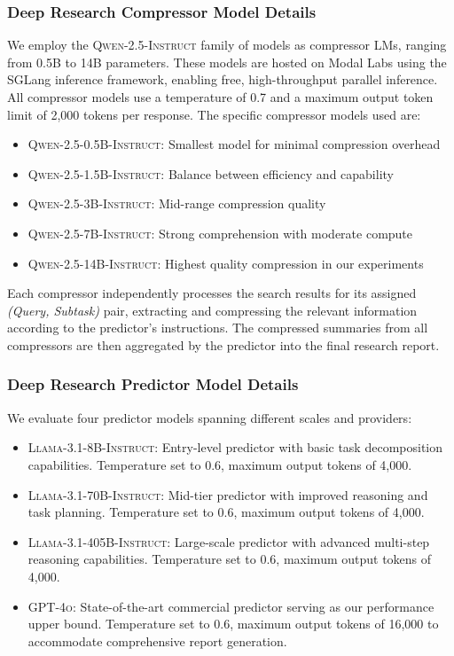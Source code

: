 \documentclass{article} %
\begin{document}
\subsubsection{Deep Research Compressor Model Details}
\label{sec:appendix-deepresearch-compressors}
We employ the \textsc{Qwen-2.5-Instruct} family of models as compressor LMs, ranging from 0.5B to 14B parameters. These models are hosted on Modal Labs using the SGLang inference framework, enabling free, high-throughput parallel inference. All compressor models use a temperature of 0.7 and a maximum output token limit of 2,000 tokens per response. The specific compressor models used are: 
\begin{itemize}[leftmargin=0.2in]
    \item \textsc{Qwen-2.5-0.5B-Instruct}: Smallest model for minimal compression overhead
    \item \textsc{Qwen-2.5-1.5B-Instruct}: Balance between efficiency and capability
    \item \textsc{Qwen-2.5-3B-Instruct}: Mid-range compression quality
    \item \textsc{Qwen-2.5-7B-Instruct}: Strong comprehension with moderate compute
    \item \textsc{Qwen-2.5-14B-Instruct}: Highest quality compression in our experiments
\end{itemize}
Each compressor independently processes the search results for its assigned \emph{(Query, Subtask)} pair, extracting and compressing the relevant information according to the predictor's instructions. The compressed summaries from all compressors are then aggregated by the predictor into the final research report.

\subsubsection{Deep Research Predictor Model Details}
\label{sec:appendix-deepresearch-predictors}
We evaluate four predictor models spanning different scales and providers:

\begin{itemize}[leftmargin=0.2in]
    \item \textsc{Llama-3.1-8B-Instruct}: Entry-level predictor with basic task decomposition capabilities. Temperature set to 0.6, maximum output tokens of 4,000.
    \item \textsc{Llama-3.1-70B-Instruct}: Mid-tier predictor with improved reasoning and task planning. Temperature set to 0.6, maximum output tokens of 4,000.
    \item \textsc{Llama-3.1-405B-Instruct}: Large-scale predictor with advanced multi-step reasoning capabilities. Temperature set to 0.6, maximum output tokens of 4,000.
    \item \textsc{GPT-4o}: State-of-the-art commercial predictor serving as our performance upper bound. Temperature set to 0.6, maximum output tokens of 16,000 to accommodate comprehensive report generation.
\end{itemize}
\end{document}
